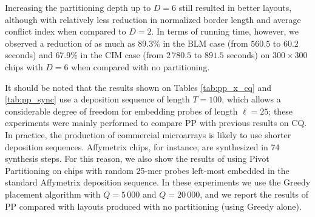 Increasing the partitioning depth up to $D=6$ still resulted in better layouts,
although with relatively less reduction in normalized border length and average
conflict index when compared to $D=2$. In terms of running time, however, we
observed a reduction of as much as $89.3\%$ in the BLM case (from $560.5$ to
$60.2$ seconds) and $67.9\%$ in the CIM case (from $2\,780.5$ to $891.5$
seconds) on $300\times 300$ chips with $D=6$ when compared with no partitioning.

It should be noted that the results shown on Tables \ref{tab:pp_x_cq} and
\ref{tab:pp_sync} use a deposition sequence of length $T=100$, which allows a
considerable degree of freedom for embedding probes of length $\ell=25$; these
experiments were mainly performed to compare PP with previous results on CQ. In
practice, the production of commercial microarrays is likely to use shorter
deposition sequences. Affymetrix chips, for instance, are synthesized in 74
synthesis steps. For this reason, we also show the results of using Pivot
Partitioning on chips with random 25-mer probes left-most embedded in the
standard Affymetrix deposition sequence. In these experiments we use the Greedy
placement algorithm with $Q=5\,000$ and $Q=20\,000$, and we report the results
of PP compared with layouts produced with no partitioning (using Greedy alone).

